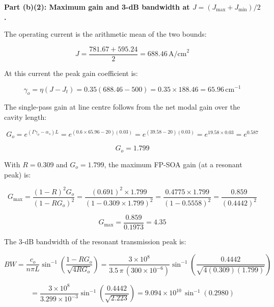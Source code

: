 \textbf{Part (b)(2): Maximum gain and 3-dB bandwidth at $J = (J_{\max}+J_{\min})/2$.}

The operating current is the arithmetic mean of the two bounds:

\begin{equation*}
  J = \frac{781.67 + 595.24}{2} = 688.46\,\text{A/cm}^2
\end{equation*}

At this current the peak gain coefficient is:

\begin{equation*}
  \gamma_o = \eta(J - J_t) = 0.35(688.46 - 500) = 0.35 \times 188.46 = 65.96\,\text{cm}^{-1}
\end{equation*}

The single-pass gain at line centre follows from the net modal gain over the cavity length:

\begin{equation*}
  G_o = e^{(\Gamma\gamma_o - \alpha_s)L} = e^{(0.6 \times 65.96 - 20)(0.03)} = e^{(39.58 - 20)(0.03)} = e^{19.58 \times 0.03} = e^{0.587}
\end{equation*}

\begin{equation*}
  G_o = 1.799
\end{equation*}

With $R = 0.309$ and $G_o = 1.799$, the maximum FP-SOA gain (at a resonant peak) is:

\begin{equation*}
  G_{\max} = \frac{(1-R)^2 G_o}{(1 - RG_o)^2} = \frac{(0.691)^2 \times 1.799}{(1 - 0.309 \times 1.799)^2} = \frac{0.4775 \times 1.799}{(1 - 0.5558)^2} = \frac{0.859}{(0.4442)^2}
\end{equation*}

\begin{equation*}
  G_{\max} = \frac{0.859}{0.1973} = 4.35
\end{equation*}

The 3-dB bandwidth of the resonant transmission peak is:

\begin{equation*}
  BW = \frac{c_o}{n\pi L}\sin^{-1}\!\left(\frac{1 - RG_o}{\sqrt{4RG_o}}\right) = \frac{3\times10^8}{3.5\,\pi\,(300\times10^{-6})}\sin^{-1}\!\left(\frac{0.4442}{\sqrt{4(0.309)(1.799)}}\right)
\end{equation*}

\begin{equation*}
  = \frac{3\times10^8}{3.299\times10^{-3}}\sin^{-1}\!\left(\frac{0.4442}{\sqrt{2.223}}\right) = 9.094\times10^{10}\,\sin^{-1}(0.2980)
\end{equation*}

